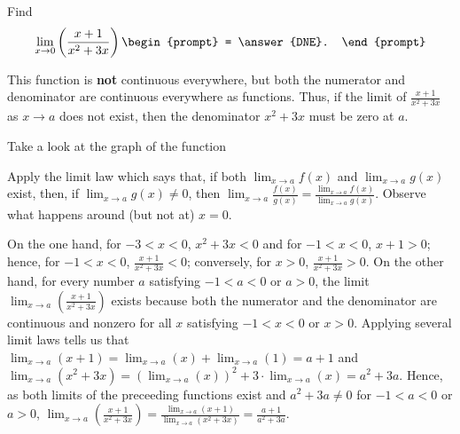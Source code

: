 \documentclass{ximera}
\author{Gregory Hartman \and Matthew Carr}
\begin{document}
\begin{exercise}



  Find 
  \[
  \lim_{x\to0} \left(\frac{x+1}{x^2+3x}\right)
  \begin{prompt}
  = \answer{DNE}.
  \end{prompt}
  \]
    \begin{hint}
      This function is \textbf{not} continuous everywhere, but both the numerator and denominator are continuous everywhere as functions. Thus, if the limit of $\frac{x+1}{x^2+3x}$ as $x\to a$ does not exist, then the denominator $x^2+3x$ must be zero at $a$.
    \end{hint}
     \begin{hint}
    Take a look at the graph of the function
    \begin{center}
      \end{center}
     Apply the limit law which says that, if both $\lim_{x\to a}f(x)$ and $\lim_{x\to a}g(x)$ exist, then, if $\lim_{x\to a}g(x)\ne0$, then $\lim_{x\to{a}}\frac{f(x)}{g(x)}=\frac{\lim_{x\to a}f(x)}{\lim_{x\to{a}}g(x)}$. Observe what happens around (but not at) $x=0$.
    \end{hint}
    \begin{hint}
     On the one hand, for $-3<x<0$, $x^2+3x<0$ and for $-1<x<0$, $x+1>0$; hence, for $-1<x<0$, $\frac{x+1}{x^2+3x}<0$; conversely, for $x>0$, $\frac{x+1}{x^2+3x}>0$. On the other hand, for every number $a$ satisfying $-1<a<0$ or $a>0$, the limit  $\lim_{x\to a}\left({\frac{x+1}{x^2+3x}}\right)$ exists because both the numerator and the denominator are continuous and nonzero for all $x$ satisfying $-1<x<0$ or $x>0$. Applying several limit laws tells us that $\lim_{x\to a}\left({x+1}\right)=\lim_{x\to a}(x)+\lim_{x\to a}\left({1}\right)=a+1$ and $\lim_{x\to a}\left({x^2+3x}\right)=\left(\lim_{x\to a}(x)\right)^2+3\cdot\lim_{x\to a}(x)=a^2+3a$. Hence, as both limits of the preceeding functions exist and $a^2+3a\ne0$ for $-1<a<0$ or $a>0$, $\lim_{x\to a}\left({\frac{x+1}{x^2+3x}}\right)=\frac{\lim_{x\to a}\left({x+1}\right)}{\lim_{x\to a}\left({x^2+3x}\right)}=\frac{a+1}{a^2+3a}$.
     

\end{hint}
\end{exercise}
\end{document}
